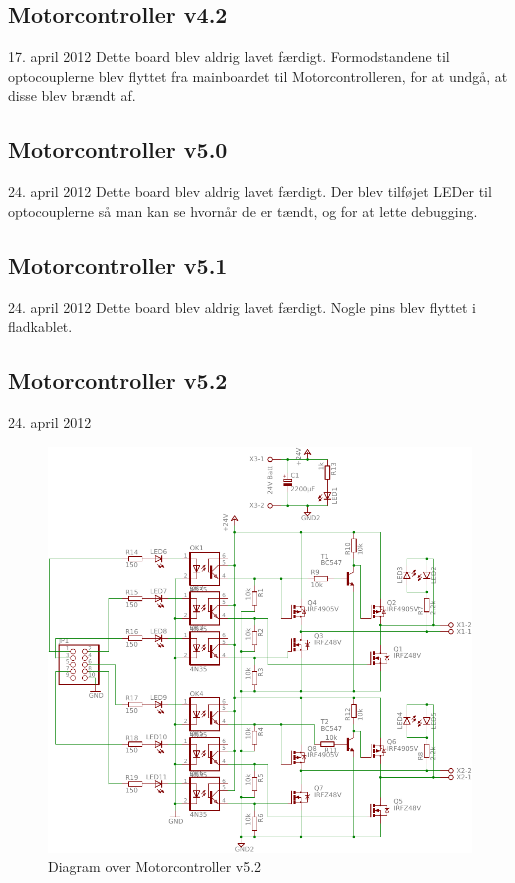 \documentclass[a4paper,twoside,article,danish,table]{memoir}
\newcommand{\boarddate}[1]{\textcolor{blue!80!black}{#1}}
\begin{document}
\subsection{Motorcontroller v4.2}
\boarddate{17. april 2012} Dette board blev aldrig lavet færdigt.
Formodstandene til optocouplerne blev flyttet fra mainboardet til Motorcontrolleren, for at undgå, at disse blev brændt af.

\subsection{Motorcontroller v5.0}
\boarddate{24. april 2012} Dette board blev aldrig lavet færdigt.
Der blev tilføjet LEDer til optocouplerne så man kan se hvornår de er tændt, og for at lette debugging.  

\subsection{Motorcontroller v5.1}
\boarddate{24. april 2012} Dette board blev aldrig lavet færdigt.
Nogle pins blev flyttet i fladkablet. 

\subsection{Motorcontroller v5.2}
\boarddate{24. april 2012}
\begin{figure}[htbp]
  \centering
  \includegraphics[width=\textwidth]{pictures/MotorcontrollerSch5-2.pdf}
  \caption{Diagram over Motorcontroller v5.2}
  \label{fig:mosch5.2}
\end{figure}
\end{document}
